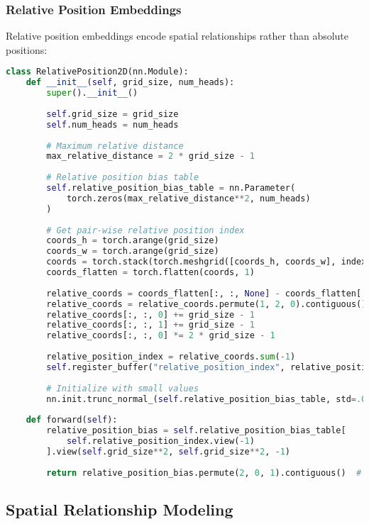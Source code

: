 \subsubsection{Relative Position Embeddings}

Relative position embeddings encode spatial relationships rather than absolute positions:

\begin{lstlisting}[language=Python, caption=2D relative position embeddings]
class RelativePosition2D(nn.Module):
    def __init__(self, grid_size, num_heads):
        super().__init__()
        
        self.grid_size = grid_size
        self.num_heads = num_heads
        
        # Maximum relative distance
        max_relative_distance = 2 * grid_size - 1
        
        # Relative position bias table
        self.relative_position_bias_table = nn.Parameter(
            torch.zeros(max_relative_distance**2, num_heads)
        )
        
        # Get pair-wise relative position index
        coords_h = torch.arange(grid_size)
        coords_w = torch.arange(grid_size)
        coords = torch.stack(torch.meshgrid([coords_h, coords_w], indexing='ij'))
        coords_flatten = torch.flatten(coords, 1)
        
        relative_coords = coords_flatten[:, :, None] - coords_flatten[:, None, :]
        relative_coords = relative_coords.permute(1, 2, 0).contiguous()
        relative_coords[:, :, 0] += grid_size - 1
        relative_coords[:, :, 1] += grid_size - 1
        relative_coords[:, :, 0] *= 2 * grid_size - 1
        
        relative_position_index = relative_coords.sum(-1)
        self.register_buffer("relative_position_index", relative_position_index)
        
        # Initialize with small values
        nn.init.trunc_normal_(self.relative_position_bias_table, std=.02)
    
    def forward(self):
        relative_position_bias = self.relative_position_bias_table[
            self.relative_position_index.view(-1)
        ].view(self.grid_size**2, self.grid_size**2, -1)
        
        return relative_position_bias.permute(2, 0, 1).contiguous()  # [num_heads, N, N]
\end{lstlisting}

\subsection{Spatial Relationship Modeling}

